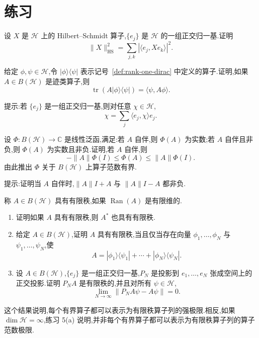 \section{练习}
\label{sec:chapter19-exercises}

\begin{exercise}\label{ex:hilbert-schmidt-matrix-elements}
设 $X$ 是 $\mathcal H$ 上的 Hilbert--Schmidt 算子,$\{e_j\}$ 是 $\mathcal H$ 的一组正交归一基.证明
\[
 \|X\|_{\mathrm{HS}}^2
 =\sum_{j,k}|\langle e_j,Xe_k\rangle|^2.
\]
\end{exercise}

\begin{exercise}[秩一算子的迹]\label{ex:trace-rank-one}
给定 $\phi,\psi\in\mathcal H$,令 $|\phi\rangle\langle\psi|$ 表示记号~\ref{def:rank-one-dirac} 中定义的算子.证明,如果 $A\in B(\mathcal H)$ 是迹类算子,则
\[
 \operatorname{tr}(A|\phi\rangle\langle\psi|)
 =\langle\psi,A\phi\rangle.
\]

提示:若 $\{e_j\}$ 是一组正交归一基,则对任意 $\chi\in\mathcal H$,
\[
 \chi=\sum_j\langle e_j,\chi\rangle e_j.
\]
\end{exercise}

\begin{exercise}[正性泛函的范数估计]\label{ex:positive-functional-bound}
设 $\Phi:B(\mathcal H)\to\mathbb C$ 是线性泛函,满足:若 $A$ 自伴,则 $\Phi(A)$ 为实数;若 $A$ 自伴且非负,则 $\Phi(A)$ 为实数且非负.证明,若 $A$ 自伴,则
\[
 -\|A\|\Phi(I)\le\Phi(A)\le\|A\|\Phi(I).
\]
由此推出 $\Phi$ 关于 $B(\mathcal H)$ 上算子范数有界.

提示:证明当 $A$ 自伴时,$\|A\|I+A$ 与 $\|A\|I-A$ 都非负.
\end{exercise}

\begin{exercise}[有限秩算子]\label{ex:finite-rank-operators}
称 $A\in B(\mathcal H)$ 具有有限秩,如果 $\operatorname{Ran}(A)$ 是有限维的.
\begin{enumerate}
\item 证明如果 $A$ 具有有限秩,则 $A^*$ 也具有有限秩.
\item 给定 $A\in B(\mathcal H)$,证明 $A$ 具有有限秩,当且仅当存在向量 $\phi_1,\ldots,\phi_N$ 与 $\psi_1,\ldots,\psi_N$,使
\[
 A=|\phi_1\rangle\langle\psi_1|+\cdots+|\phi_N\rangle\langle\psi_N|.
\]
\item 设 $A\in B(\mathcal H)$,$\{e_j\}$ 是一组正交归一基,$P_N$ 是投影到 $e_1,\ldots,e_N$ 张成空间上的正交投影.证明 $P_NA$ 是有限秩的,并且对所有 $\psi\in\mathcal H$,
\[
 \lim_{N\to\infty}\|P_NA\psi-A\psi\|=0.
\]
\end{enumerate}

\begin{note}
这个结果说明,每个有界算子都可以表示为有限秩算子列的强极限.相反,如果 $\dim\mathcal H=\infty$,练习 5(a) 说明,并非每个有界算子都可以表示为有限秩算子列的算子范数极限.
\end{note}
\end{exercise}


